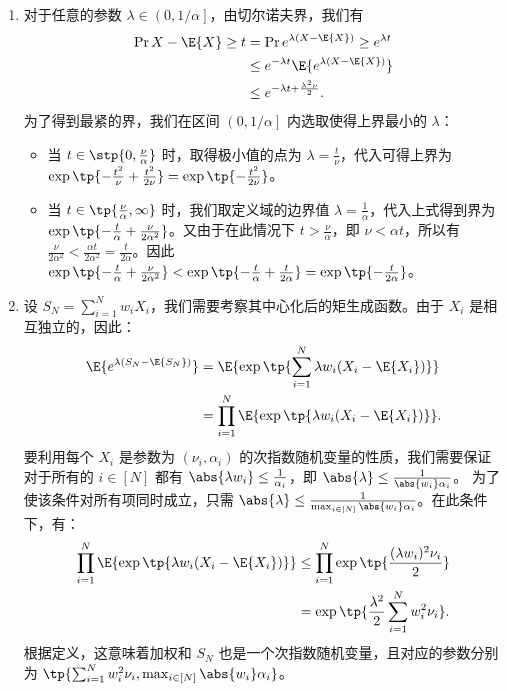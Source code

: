 \begin{solution}
    \begin{enumerate}
        \item 对于任意的参数 $\lambda \in \left(0, 1/\alpha \right]$，由切尔诺夫界，我们有
        \begin{align*}
            \Pr{X - \E{X} \ge t} &= \Pr{e^{\lambda(X - \E{X})} \ge e^{\lambda t}} \\
            &\le e^{-\lambda t} \E{e^{\lambda(X - \E{X})}} \\
            &\le e^{-\lambda t + \frac{\lambda^2 \nu}{2}}.
        \end{align*}
        为了得到最紧的界，我们在区间 $\left(0, 1/\alpha\right]$ 内选取使得上界最小的 $\lambda$：
        \begin{itemize}
            \item 当 $t \in \stp{0, \frac{\nu}{\alpha}}$ 时，取得极小值的点为 $\lambda = \frac{t}{\nu}$，代入可得上界为 $\exp\tp{-\frac{t^2}{\nu} + \frac{t^2}{2\nu}} = \exp\tp{-\frac{t^2}{2\nu}}$。
            \item 当 $t \in \tp{\frac{\nu}{\alpha}, \infty}$ 时，我们取定义域的边界值 $\lambda = \frac{1}{\alpha}$，代入上式得到界为 $\exp\tp{-\frac{t}{\alpha} + \frac{\nu}{2\alpha^2}}$。又由于在此情况下 $t > \frac{\nu}{\alpha}$，即 $\nu < \alpha t$，所以有 $\frac{\nu}{2\alpha^2} < \frac{\alpha t}{2\alpha^2} = \frac{t}{2\alpha}$。因此 $\exp\tp{-\frac{t}{\alpha} + \frac{\nu}{2\alpha^2}} < \exp\tp{-\frac{t}{\alpha} + \frac{t}{2\alpha}} = \exp\tp{-\frac{t}{2\alpha}}$。
        \end{itemize}

        \item 设 $S_N = \sum_{i=1}^N w_i X_i$，我们需要考察其中心化后的矩生成函数。由于 $X_i$ 是相互独立的，因此：
        \begin{align*}
            \E{e^{\lambda (S_N - \E{S_N})}} &= \E{\exp\tp{\sum_{i=1}^N \lambda w_i (X_i - \E{X_i})}} \\
            &= \prod_{i=1}^N \E{\exp\tp{\lambda w_i (X_i - \E{X_i})}}.
        \end{align*}
        要利用每个 $X_i$ 是参数为 $(\nu_i, \alpha_i)$ 的次指数随机变量的性质，我们需要保证对于所有的 $i \in [N]$ 都有 $\abs{\lambda w_i} \le \frac{1}{\alpha_i}$，即 $\abs{\lambda} \le \frac{1}{\abs{w_i}\alpha_i}$。
        为了使该条件对所有项同时成立，只需 $\abs{\lambda} \le \frac{1}{\max_{i \in [N]} \abs{w_i} \alpha_i}$。在此条件下，有：
        \begin{align*}
            \prod_{i=1}^N \E{\exp\tp{\lambda w_i (X_i - \E{X_i})}} &\le \prod_{i=1}^N \exp\tp{\frac{(\lambda w_i)^2 \nu_i}{2}} \\
            &= \exp\tp{\frac{\lambda^2}{2} \sum_{i=1}^N w_i^2 \nu_i}.
        \end{align*}
        根据定义，这意味着加权和 $S_N$ 也是一个次指数随机变量，且对应的参数分别为 $\tp{\sum_{i=1}^N w_i^2 \nu_i, \max_{i \in [N]} \abs{w_i} \alpha_i}$。


\end{enumerate}
\end{solution}
